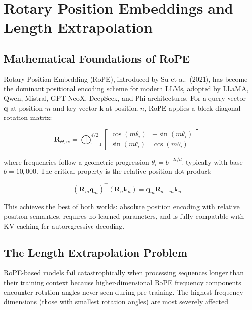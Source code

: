 \documentclass[11pt,a4paper]{article}
\begin{document}
\section{Rotary Position Embeddings and Length Extrapolation}
\label{sec:rope}

\subsection{Mathematical Foundations of RoPE}

Rotary Position Embedding (RoPE), introduced by Su et al.\ (2021), has become the dominant positional encoding scheme for modern LLMs, adopted by LLaMA, Qwen, Mistral, GPT-NeoX, DeepSeek, and Phi architectures. For a query vector $\mathbf{q}$ at position $m$ and key vector $\mathbf{k}$ at position $n$, RoPE applies a block-diagonal rotation matrix:

\begin{equation}
\mathbf{R}_{\Theta,m} = \bigoplus_{i=1}^{d/2}
\begin{bmatrix}
\cos(m\theta_i) & -\sin(m\theta_i) \\
\sin(m\theta_i) & \cos(m\theta_i)
\end{bmatrix}
\end{equation}

where frequencies follow a geometric progression $\theta_i = b^{-2i/d}$, typically with base $b = 10{,}000$. The critical property is the relative-position dot product:

\begin{equation}
(\mathbf{R}_m \mathbf{q}_m)^\top (\mathbf{R}_n \mathbf{k}_n) = \mathbf{q}_m^\top \mathbf{R}_{n-m} \mathbf{k}_n
\end{equation}

This achieves the best of both worlds: absolute position encoding with relative position semantics, requires no learned parameters, and is fully compatible with KV-caching for autoregressive decoding.

\subsection{The Length Extrapolation Problem}

RoPE-based models fail catastrophically when processing sequences longer than their training context because higher-dimensional RoPE frequency components encounter rotation angles never seen during pre-training. The highest-frequency dimensions (those with smallest rotation angles) are most severely affected.
\end{document}
